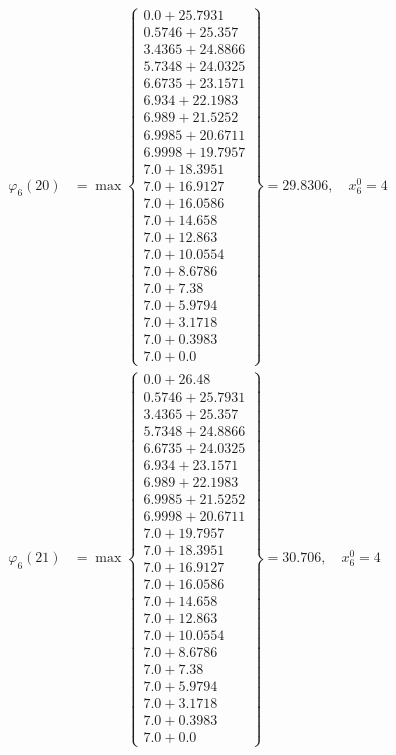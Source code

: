 \documentclass{article}
\begin{document}
\begin{align*}
\varphi_{6}(20) &= \max \left\{ \begin{array}{c}
0.0 + 25.7931 \\
 0.5746 + 25.357 \\
 3.4365 + 24.8866 \\
 5.7348 + 24.0325 \\
 6.6735 + 23.1571 \\
 6.934 + 22.1983 \\
 6.989 + 21.5252 \\
 6.9985 + 20.6711 \\
 6.9998 + 19.7957 \\
 7.0 + 18.3951 \\
 7.0 + 16.9127 \\
 7.0 + 16.0586 \\
 7.0 + 14.658 \\
 7.0 + 12.863 \\
 7.0 + 10.0554 \\
 7.0 + 8.6786 \\
 7.0 + 7.38 \\
 7.0 + 5.9794 \\
 7.0 + 3.1718 \\
 7.0 + 0.3983 \\
 7.0 + 0.0
\end{array} \right\}=29.8306, \quad x_{6}^0=4\\
  
\varphi_{6}(21) &= \max \left\{ \begin{array}{c}
0.0 + 26.48 \\
 0.5746 + 25.7931 \\
 3.4365 + 25.357 \\
 5.7348 + 24.8866 \\
 6.6735 + 24.0325 \\
 6.934 + 23.1571 \\
 6.989 + 22.1983 \\
 6.9985 + 21.5252 \\
 6.9998 + 20.6711 \\
 7.0 + 19.7957 \\
 7.0 + 18.3951 \\
 7.0 + 16.9127 \\
 7.0 + 16.0586 \\
 7.0 + 14.658 \\
 7.0 + 12.863 \\
 7.0 + 10.0554 \\
 7.0 + 8.6786 \\
 7.0 + 7.38 \\
 7.0 + 5.9794 \\
 7.0 + 3.1718 \\
 7.0 + 0.3983 \\
 7.0 + 0.0
\end{array} \right\}=30.706, \quad x_{6}^0=4\\
  

\end{align*}
\end{document}
